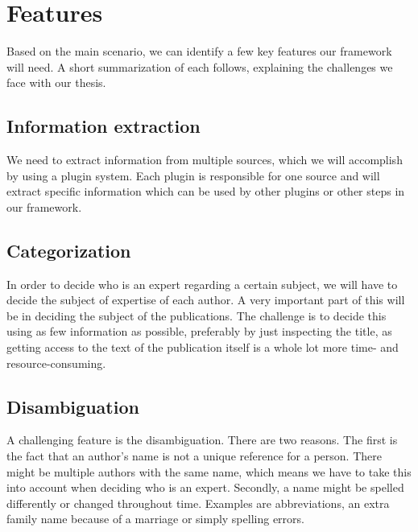
\section{Features}

Based on the main scenario, we can identify a few key features our framework will need. A short summarization of each follows, explaining the challenges we face with our thesis.


\subsection{Information extraction}

We need to extract information from multiple sources, which we will accomplish by using a plugin system. Each plugin is responsible for one source and will extract specific information which can be used by other plugins or other steps in our framework.

\subsection{Categorization}

In order to decide who is an expert regarding a certain subject, we will have to decide the subject of expertise of each author. A very important part of this will be in deciding the subject of the publications. The challenge is to decide this using as few information as possible, preferably by just inspecting the title, as getting access to the text of the publication itself is a whole lot more time- and resource-consuming.

\subsection{Disambiguation}

A challenging feature is the disambiguation. There are two reasons. The first is the fact that an author's name is not a unique reference for a person. There might be multiple authors with the same name, which means we have to take this into account when deciding who is an expert. Secondly, a name might be spelled differently or changed throughout time. Examples are abbreviations, an extra family name because of a marriage or simply spelling errors.

